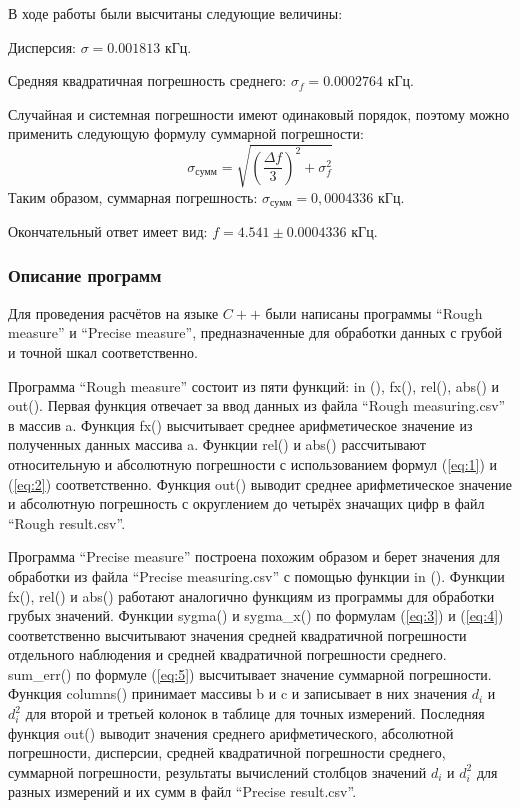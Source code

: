 В ходе работы были высчитаны следующие величины:

Дисперсия: $\sigma=0.001813$ кГц.

Средняя квадратичная погрешность среднего: $\sigma_f=0.0002764$ кГц.

Случайная и системная погрешности имеют одинаковый порядок, поэтому можно применить следующую формулу суммарной погрешности:
\begin{equation}
\label{eq:5}
\sigma_{сумм}=\sqrt{(\frac{\Delta f}{3})^2+\sigma_f^2}
\end{equation}
Таким образом, суммарная погрешность: $\sigma_{сумм}=0,0004336$ кГц.

Окончательный ответ имеет вид: $f=4.541\pm0.0004336$ кГц.

\subsubsection{Описание программ}
Для проведения расчётов на языке $C++$ были написаны программы ``Rough measure'' и ``Precise measure'', предназначенные для обработки данных с грубой и точной шкал соответственно.

Программа ``Rough measure'' состоит из пяти функций: in (), fx(), rel(), abs() и out(). Первая функция отвечает за ввод данных из файла ``Rough measuring.csv'' в массив a. Функция fx() высчитывает среднее арифметическое значение из полученных данных массива a. Функции rel() и abs() рассчитывают относительную и абсолютную погрешности с использованием формул (\ref{eq:1}) и (\ref{eq:2}) соответственно. Функция out() выводит среднее арифметическое значение и абсолютную погрешность с округлением до четырёх значащих цифр в файл ``Rough result.csv''.

Программа ``Precise measure'' построена похожим образом и берет значения для обработки из файла ``Precise measuring.csv'' с помощью функции in (). Функции fx(), rel() и abs() работают аналогично функциям из программы для обработки грубых значений. Функции sygma() и sygma\_x() по формулам (\ref{eq:3}) и (\ref{eq:4}) соответственно высчитывают значения средней квадратичной погрешности отдельного наблюдения и средней квадратичной погрешности среднего. sum\_err() по формуле (\ref{eq:5}) высчитывает значение суммарной погрешности. Функция columns() принимает массивы b и c и записывает в них значения $d_i$ и $d_i^2$ для второй и третьей колонок в таблице для точных измерений. Последняя функция out() выводит значения среднего арифметического, абсолютной погрешности, дисперсии, средней квадратичной погрешности среднего, суммарной погрешности, результаты вычислений столбцов значений $d_i$ и $d_i^2$ для разных измерений и их сумм в файл ``Precise result.csv''.


